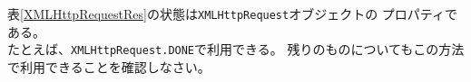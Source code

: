 \begin{Prob}\upshape
 表\ref{XMLHttpRequestRes}の状態は\texttt{XMLHttpRequest}オブジェクトの
 プロパティである。\\たとえば、\texttt{XMLHttpRequest.DONE}で利用できる。
 残りのものについてもこの方法で利用できることを確認しなさい。
\end{Prob}
